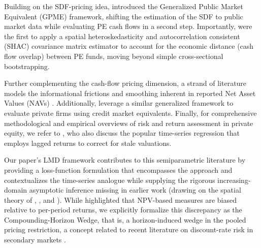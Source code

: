 Building on the SDF-pricing idea, \cite{KN16} introduced the Generalized Public Market Equivalent (GPME) framework, shifting the estimation of the SDF to public market data while evaluating PE cash flows in a second step. 
Importantly, \cite{KN16} were the first to apply a spatial heteroskedasticity and autocorrelation consistent (SHAC) covariance matrix estimator \citep{C99} to account for the economic distance (cash flow overlap) between PE funds, moving beyond simple cross-sectional bootstrapping.

Further complementing the cash-flow pricing dimension, a strand of literature models the informational frictions and smoothing inherent in reported Net Asset Values (NAVs) \citep{BGK19, JLRS20, brown2023nowcasting}. 
Additionally, \cite{HSS23} leverage a similar generalized framework to evaluate private firms using credit market equivalents.
Finally, for comprehensive methodological and empirical overviews of risk and return assessment in private equity, we refer to \cite{K19,korteweg2023risk}, who also discuss the popular \cite{D79} time-series regression that employs lagged returns to correct for stale valuations.

Our paper's LMD framework contributes to this semiparametric literature by providing a loss-function formulation that encompasses the \cite{DLP12} approach and contextualizes the \cite{KN16} time-series analogue while supplying the rigorous increasing-domain asymptotic inference missing in earlier work (drawing on the spatial theory of \cite{PP97}, \cite{KS11}, and \cite{JP12}). 
While \cite{GSW20} highlighted that NPV-based measures are biased relative to per-period returns, we explicitly formalize this discrepancy as the Compounding-Horizon Wedge, that is, a horizon-induced wedge in the pooled pricing restriction, a concept related to recent literature on discount-rate risk in secondary markets \citep{boyer2023discount}.

